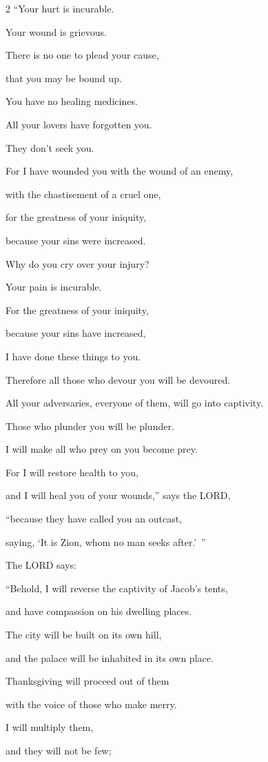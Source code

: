 \begin{multicols}{2}
“Your hurt is incurable.

Your wound is grievous.


\myverse{}There is no one to plead your cause,

that you may be bound up.

You have no healing medicines.


\myverse{}All your lovers have forgotten you.
			
They don’t seek you.

For I have wounded you with the wound of an enemy,

with the chastisement of a cruel one,

for the greatness of your iniquity,

because your sins were increased.


\myverse{}Why do you cry over your injury?

Your pain is incurable.

For the greatness of your iniquity,

because your sins have increased,

I have done these things to you.


\myverse{}Therefore all those who devour you will be devoured.

All your adversaries, everyone of them, will go into captivity.

Those who plunder you will be plunder.

I will make all who prey on you become prey.


\myverse{}For I will restore health to you,

and I will heal you of your wounds,” says the LORD,

“because they have called you an outcast,

saying, ‘It is Zion, whom no man seeks after.’ ”


\myverse{}The LORD says:

“Behold, I will reverse the captivity of Jacob’s tents,

and have compassion on his dwelling places.

The city will be built on its own hill,

and the palace will be inhabited in its own place.


\myverse{}Thanksgiving will proceed out of them

with the voice of those who make merry.

I will multiply them,

and they will not be few;


\end{multicols}
